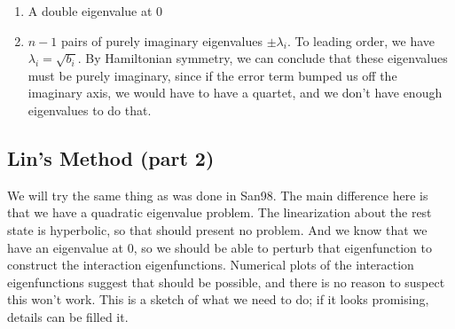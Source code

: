\documentclass[12pt]{article}
\begin{document}
\begin{enumerate}
	\item A double eigenvalue at 0
	\item $n-1$ pairs of purely imaginary eigenvalues $\pm \lambda_i$. To leading order, we have $\lambda_i = \sqrt{b_i}$. By Hamiltonian symmetry, we can conclude that these eigenvalues must be purely imaginary, since if the error term bumped us off the imaginary axis, we would have to have a quartet, and we don't have enough eigenvalues to do that.
\end{enumerate}

\subsection{Lin's Method (part 2)}

We will try the same thing as was done in San98. The main difference here is that we have a quadratic eigenvalue problem. The linearization about the rest state is hyperbolic, so that should present no problem. And we know that we have an eigenvalue at 0, so we should be able to perturb that eigenfunction to construct the interaction eigenfunctions. Numerical plots of the interaction eigenfunctions suggest that should be possible, and there is no reason to suspect this won't work. This is a sketch of what we need to do; if it looks promising, details can be filled it.
\end{document}
